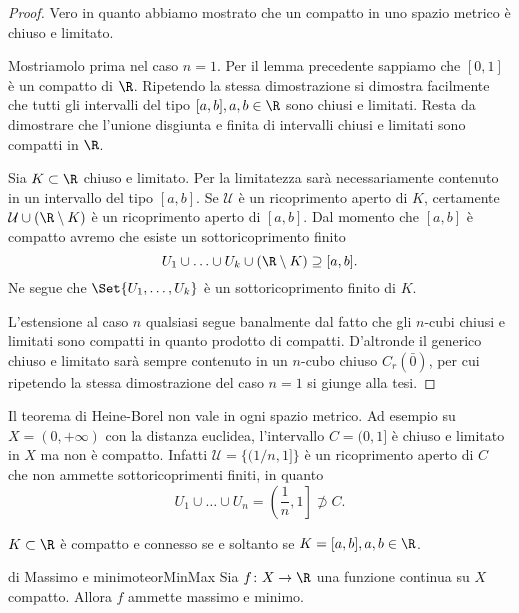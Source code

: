 \begin{proof}
	\graffito{\(\Rightarrow)\)}Vero in quanto abbiamo mostrato che un compatto in uno spazio metrico è chiuso e limitato.

	\graffito{\(\Leftarrow)\)}Mostriamolo prima nel caso \(n=1\).
	Per il lemma precedente sappiamo che \([0,1]\) è un compatto di \(\R\).
	Ripetendo la stessa dimostrazione si dimostra facilmente che tutti gli intervalli del tipo \([a,b],a,b\in\R\) sono chiusi e limitati.
	Resta da dimostrare che l'unione disgiunta e finita di intervalli chiusi e limitati sono compatti in \(\R\).

	Sia \(K\subset\R\) chiuso e limitato. Per la limitatezza sarà necessariamente contenuto in un intervallo del tipo \([a,b]\).
	Se \(\mathcal{U}\) è un ricoprimento aperto di \(K\), certamente \(\mathcal{U}\cup (\R\setminus K)\) è un ricoprimento aperto di \([a,b].\)
	Dal momento che \([a,b]\) è compatto avremo che esiste un sottoricoprimento finito
	\[
		U_1 \cup \ldots \cup U_k \cup (\R \setminus K) \supseteq [a,b].
	\]
	Ne segue che \(\Set{U_1,\ldots,U_k}\) è un sottoricoprimento finito di \(K\).

	L'estensione al caso \(n\) qualsiasi segue banalmente dal fatto che gli \(n\)-cubi chiusi e limitati sono compatti in quanto prodotto di compatti.
	D'altronde il generico chiuso e limitato sarà sempre contenuto in un \(n\)-cubo chiuso \(C_r(\bar{0})\), per cui ripetendo la stessa dimostrazione del caso \(n=1\) si giunge alla tesi.
\end{proof}

\begin{oss}
	Il teorema di Heine-Borel non vale in ogni spazio metrico.
	Ad esempio su \(X=(0,+\infty)\) con la distanza euclidea, l'intervallo \(C=(0,1]\) è chiuso e limitato in \(X\) ma non è compatto.
	Infatti \(\mathcal{U}=\{(1/n,1]\}\) è un ricoprimento aperto di \(C\) che non ammette sottoricoprimenti finiti, in quanto
	\[
		U_1 \cup \ldots \cup U_n = \left(\frac{1}{n},1\right] \not\supset C.
	\]
\end{oss}

\begin{cor}
	\(K\subset \R\) è compatto e connesso se e soltanto se \(K=[a,b],a,b\in\R\).
\end{cor}

\begin{teor}{di Massimo e minimo}{teorMinMax}
	Sia \(f\colon X\to \R\) una funzione continua su \(X\) compatto.
	Allora \(f\) ammette massimo e minimo.
\end{teor}

